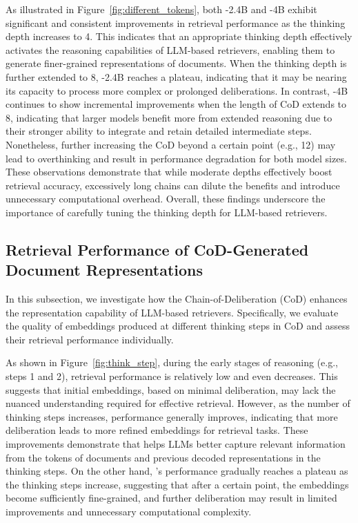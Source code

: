 
As illustrated in Figure~\ref{fig:different_tokens}, both \method{}-2.4B and \method{}-4B exhibit significant and consistent improvements in retrieval performance as the thinking depth increases to 4. 
This indicates that an appropriate thinking depth effectively activates the reasoning capabilities of LLM-based retrievers, enabling them to generate finer-grained representations of documents. 
When the thinking depth is further extended to 8, \method{}-2.4B reaches a plateau, indicating that it may be nearing its capacity to process more complex or prolonged deliberations.
In contrast, \method{}-4B continues to show incremental improvements when the length of CoD extends to 8, indicating that larger models benefit more from extended reasoning due to their stronger ability to integrate and retain detailed intermediate steps. 
Nonetheless, further increasing the CoD beyond a certain point (e.g., 12) may lead to overthinking and result in performance degradation for both model sizes. These observations demonstrate that while moderate depths effectively boost retrieval accuracy, excessively long chains can dilute the benefits and introduce unnecessary computational overhead. Overall, these findings underscore the importance of carefully tuning the thinking depth for LLM-based retrievers.


\subsection{Retrieval Performance of CoD-Generated Document Representations} \label{5_4_CoD}

In this subsection, we investigate how the Chain-of-Deliberation (CoD) enhances the representation capability of LLM-based retrievers. Specifically, we evaluate the quality of embeddings produced at different thinking steps in CoD and assess their retrieval performance individually.

As shown in Figure~\ref{fig:think_step}, during the early stages of reasoning (e.g., steps 1 and 2), retrieval performance is relatively low and even decreases. This suggests that initial embeddings, based on minimal deliberation, may lack the nuanced understanding required for effective retrieval. However, as the number of thinking steps increases, performance generally improves, indicating that more deliberation leads to more refined embeddings for retrieval tasks. These improvements demonstrate that \method{} helps LLMs better capture relevant information from the tokens of documents and previous decoded representations in the thinking steps.
On the other hand, \method{}'s performance gradually reaches a plateau as the thinking steps increase, suggesting that after a certain point, the embeddings become sufficiently fine-grained, and further deliberation may result in limited improvements and unnecessary computational complexity.


